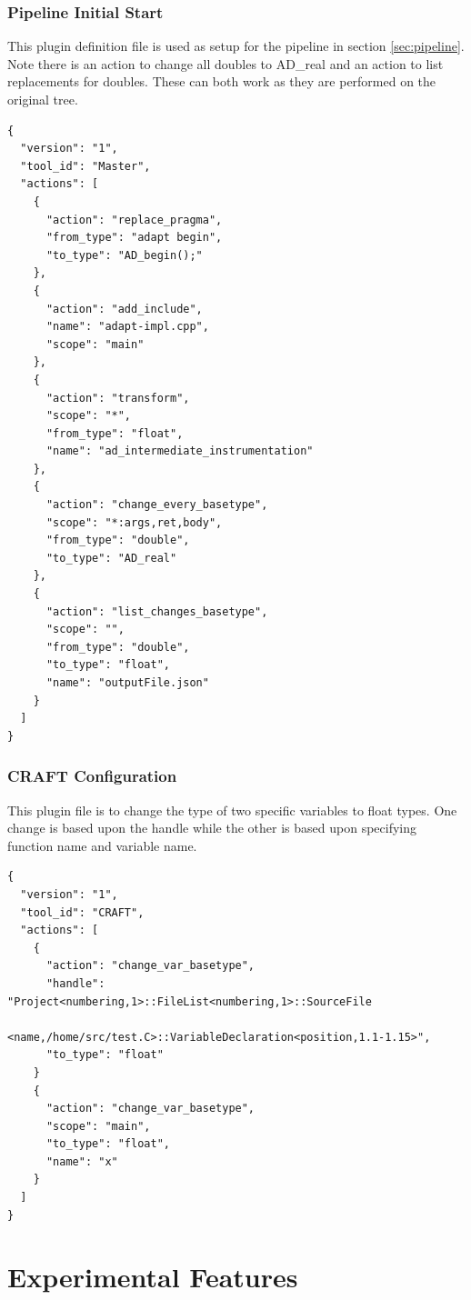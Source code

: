 \documentclass[natbib]{article}
\begin{document}
\subsubsection{Pipeline Initial Start}
This plugin definition file is used as setup for the pipeline in section \ref{sec:pipeline}. 
Note there is an action to change all doubles to AD\_real and an action to 
list replacements for doubles. These can both work as they are performed on the original tree.
\begin{verbatim}
{
  "version": "1",
  "tool_id": "Master",
  "actions": [
    {
      "action": "replace_pragma",
      "from_type": "adapt begin",
      "to_type": "AD_begin();"
    },
    {
      "action": "add_include",
      "name": "adapt-impl.cpp",
      "scope": "main"
    },
    {
      "action": "transform",
      "scope": "*",
      "from_type": "float",
      "name": "ad_intermediate_instrumentation"
    },
    {
      "action": "change_every_basetype",
      "scope": "*:args,ret,body",
      "from_type": "double",
      "to_type": "AD_real"
    },
    {
      "action": "list_changes_basetype",
      "scope": "",
      "from_type": "double",
      "to_type": "float",
      "name": "outputFile.json"
    }
  ]
}
\end{verbatim}

\subsubsection{CRAFT Configuration}
This plugin file is to change the type of two specific variables to float types.
One change is based upon the handle while the other is based upon specifying function 
name and variable name.

\begin{verbatim}
{
  "version": "1",
  "tool_id": "CRAFT",
  "actions": [
  	{
  	  "action": "change_var_basetype",
  	  "handle": "Project<numbering,1>::FileList<numbering,1>::SourceFile
                  <name,/home/src/test.C>::VariableDeclaration<position,1.1-1.15>",
      "to_type": "float"
    }
    {
  	  "action": "change_var_basetype",
      "scope": "main",
      "to_type": "float",
      "name": "x"
    }
  ]
}
\end{verbatim}

\section{Experimental Features} \label{analysis}
\end{document}
